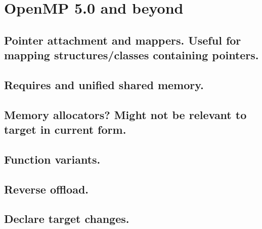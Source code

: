 
\chapter{OpenMP 5.0 and beyond}
\label{chapter:future}

\section{Pointer attachment and mappers. Useful for mapping structures/classes containing pointers.}
\section{Requires and unified shared memory.}
\section{Memory allocators? Might not be relevant to target in current form.}
\section{Function variants.}
\section{Reverse offload.}
\section{Declare target changes.}

